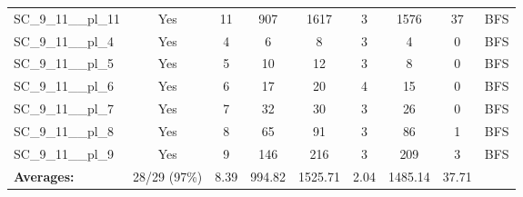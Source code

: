 \documentclass{article}
\begin{document}
\begin{tabular}{lcccccccc}
SC\_9\_11\_\_pl\_11 & Yes & 11 & 907 & 1617 & 3 & 1576 & 37 & BFS \\
SC\_9\_11\_\_pl\_4 & Yes & 4 & 6 & 8 & 3 & 4 & 0 & BFS \\
SC\_9\_11\_\_pl\_5 & Yes & 5 & 10 & 12 & 3 & 8 & 0 & BFS \\
SC\_9\_11\_\_pl\_6 & Yes & 6 & 17 & 20 & 4 & 15 & 0 & BFS \\
SC\_9\_11\_\_pl\_7 & Yes & 7 & 32 & 30 & 3 & 26 & 0 & BFS \\
SC\_9\_11\_\_pl\_8 & Yes & 8 & 65 & 91 & 3 & 86 & 1 & BFS \\
SC\_9\_11\_\_pl\_9 & Yes & 9 & 146 & 216 & 3 & 209 & 3 & BFS \\
\textbf{Averages:} & 28/29 (97\%) & 8.39 & 994.82 & 1525.71 & 2.04 & 1485.14 & 37.71 & \\
\bottomrule
\end{tabular}
\\[0.7cm]
\end{document}
